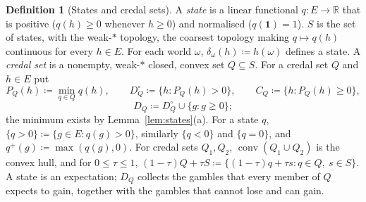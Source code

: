 \documentclass[11pt]{article}
\theoremstyle{definition}
\newtheorem{definition}[theorem]{Definition}
\newcommand{\R}{\mathbb R}
\newcommand{\one}{\mathbf 1}
\DeclareMathOperator{\conv}{conv}
\begin{document}
\begin{definition}[States and credal sets]\label{def:states}
A \emph{state} is a linear functional $q:E\to\R$ that is positive ($q(h)\ge0$ whenever $h\ge0$) and normalised ($q(\one)=1$). $S$ is the set of states, with the weak-$\ast$ topology, the coarsest topology making $q\mapsto q(h)$ continuous for every $h\in E$. For each world $\omega$, $\delta_\omega(h)\coloneqq h(\omega)$ defines a state. A \emph{credal set} is a nonempty, weak-$\ast$ closed, convex set $Q\subseteq S$. For a credal set $Q$ and $h\in E$ put
\[
P_Q(h)\coloneqq\min_{q\in Q}q(h),\qquad D^\circ_Q\coloneqq\{h:P_Q(h)>0\},\qquad C_Q\coloneqq\{h:P_Q(h)\ge0\},
\]
\[
D_Q\coloneqq D^\circ_Q\cup\{g:g\gneq0\};
\]
the minimum exists by Lemma~\ref{lem:states}(a). For a state $q$, $\{q>0\}\coloneqq\{g\in E:q(g)>0\}$, similarly $\{q<0\}$ and $\{q=0\}$, and $q^+(g)\coloneqq\max(q(g),0)$. For credal sets $Q_1,Q_2$, $\conv(Q_1\cup Q_2)$ is the convex hull, and for $0\le\tau\le1$, $(1-\tau)Q+\tau S\coloneqq\{(1-\tau)q+\tau s:q\in Q,\ s\in S\}$. {\color{red}A state is an expectation; $D_Q$ collects the gambles that every member of $Q$ expects to gain, together with the gambles that cannot lose and can gain.}
\end{definition}
\end{document}
